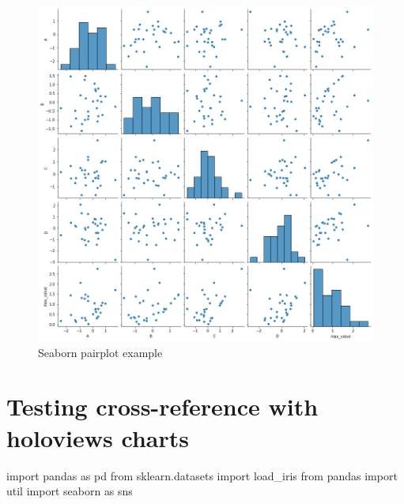 \documentclass[
  letterpaper,
  DIV=11,
  numbers=noendperiod]{scrartcl}
\newenvironment{Shaded}{\begin{snugshade}}{\end{snugshade}}
\newcommand{\ImportTok}[1]{\textcolor[rgb]{0.00,0.46,0.62}{#1}}
\newcommand{\NormalTok}[1]{\textcolor[rgb]{0.00,0.23,0.31}{#1}}
\begin{document}
\begin{figure}

{\centering \includegraphics{./testing_files/figure-pdf/fig-pairplot-output-1.png}

}

\caption{\label{fig-pairplot}Seaborn pairplot example}

\end{figure}


\hypertarget{testing-cross-reference-with-holoviews-charts-1}{%
\chapter{Testing cross-reference with holoviews
charts}\label{testing-cross-reference-with-holoviews-charts-1}}

\begin{Shaded}
\begin{Highlighting}[]

\ImportTok{import}\NormalTok{ pandas }\ImportTok{as}\NormalTok{ pd}
\ImportTok{from}\NormalTok{ sklearn.datasets }\ImportTok{import}\NormalTok{ load\_iris}
\ImportTok{from}\NormalTok{ pandas }\ImportTok{import}\NormalTok{ util}
\ImportTok{import}\NormalTok{ seaborn }\ImportTok{as}\NormalTok{ sns}
\end{Highlighting}
\end{Shaded}
\end{document}
